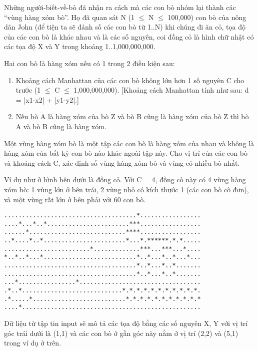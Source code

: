 



   Những người-biết-về-bò đã nhận ra cách mà các con bò nhóm lại thành  các “vùng hàng xóm bò”. Họ đã quan sát N (1  $\le$  N  $\le$  100,000) con bò của  nông dân John (để tiện ta sẽ đánh số các con bò từ 1..N) khi chúng  đi ăn cỏ, tọa độ của các con bò là khác nhau và là các số nguyên,  coi đồng cỏ là hình chữ nhật có các tọa độ X và Y trong  khoảng 1..1,000,000,000.  

   Hai con bò là hàng xóm nếu có 1 trong 2 điều kiện sau:  
\begin{enumerate}
	\item     Khoảng cách Manhattan của các con bò không lớn hơn 1 số nguyên       C cho trước (1  $\le$  C  $\le$  1,000,000,000). [Khoảng cách Manhattan      tính như sau: d = |x1-x2| + |y1-y2|.]   
	\item     Nếu bò A là hàng xóm của bò Z và bò B cũng là hàng xóm của bò Z       thì bò A và bò B cũng là hàng xóm.   
\end{enumerate}

   Một vùng hàng xóm bò là một tập các con bò là hàng xóm của nhau  và không là hàng xóm của bất kỳ con bò nào khác ngoài tập này. Cho vị trí của các con bò và khoảng cách C, xác định số vùng hàng  xóm bò và vùng có nhiều bò nhất.  

   Ví dụ như ở hình bên dưới là đồng cỏ. Với C = 4, đồng cỏ này có  4 vùng hàng xóm bò: 1 vùng lớn ở bên trái, 2 vùng nhỏ có  kích thước 1 (các con bò cô đơn), và một vùng rất lớn ở bên  phải với 60 con bò.  
\begin{verbatim}
.....................................*.................
....*...*..*.......................***.................
......*...........................****.................
..*....*..*.......................*...*.******.*.*.....
........................*.............***...***...*....
*..*..*...*..........................*..*...*..*...*...
.....................................*..*...*..*.......
.....................................*..*...*..*.......
...*................*..................................
.*..*............................*.*.*.*.*.*.*.*.*.*.*.
.*.....*..........................*.*.*.*.*.*.*.*.*.*.*
....*..................................................
\end{verbatim}

   Dữ liệu từ tập tin input sẽ mô tả các tọa độ bằng các số  nguyên X, Y với vị trí góc trái dưới là (1,1) và các con bò  ở gần góc này nằm ở vị trí (2,2) và (5,1) trong ví dụ ở trên.  


